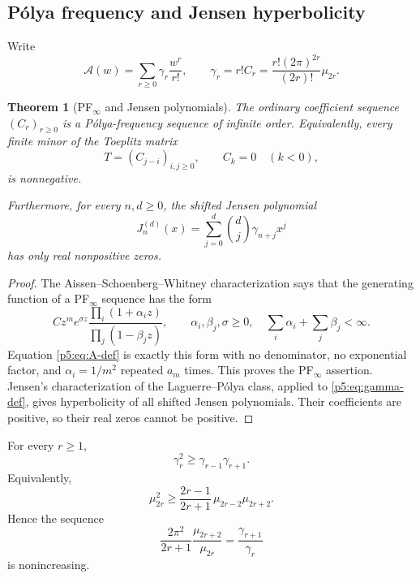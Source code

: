 \documentclass[11pt]{article}
\numberwithin{equation}{section}
\newtheorem{theorem}{Theorem}[section]
\theoremstyle{definition}
\theoremstyle{remark}
\begin{document}
\subsection{P\'olya frequency and Jensen hyperbolicity}

Write
\begin{equation}\label{p5:eq:gamma-def}
 \mathcal A(w)=\sum_{r\ge0}\gamma_r\frac{w^r}{r!},
 \qquad
 \gamma_r=r!C_r
 =\frac{r!(2\pi)^{2r}}{(2r)!}\mu_{2r}.
\end{equation}

\begin{theorem}[PF$_\infty$ and Jensen polynomials]\label{p5:thm:PF-Jensen}
The ordinary coefficient sequence $(C_r)_{r\ge0}$ is a P\'olya-frequency
sequence of infinite order.  Equivalently, every finite minor of the Toeplitz
matrix
\begin{equation}\label{p5:eq:Toeplitz}
 T=(C_{j-i})_{i,j\ge0},\qquad C_k=0\quad(k<0),
\end{equation}
is nonnegative.

Furthermore, for every $n,d\ge0$, the shifted Jensen polynomial
\begin{equation}\label{p5:eq:Jensen}
 J_n^{(d)}(x)=\sum_{j=0}^{d}\binom dj\gamma_{n+j}x^j
\end{equation}
has only real nonpositive zeros.
\end{theorem}

\begin{proof}
The Aissen--Schoenberg--Whitney characterization says that the generating
function of a PF$_\infty$ sequence has the form
\[
 Cz^me^{\sigma z}\frac{\prod_i(1+\alpha_i z)}
 {\prod_j(1-\beta_jz)},
 \qquad \alpha_i,\beta_j,\sigma\ge0,
 \quad \sum_i\alpha_i+\sum_j\beta_j<\infty.
\]
Equation \cref{p5:eq:A-def} is exactly this form with no denominator, no
exponential factor, and $\alpha_i=1/m^2$ repeated $a_m$ times.  This proves the
PF$_\infty$ assertion.  Jensen's characterization of the Laguerre--P\'olya
class, applied to \cref{p5:eq:gamma-def}, gives hyperbolicity of all shifted
Jensen polynomials.  Their coefficients are positive, so their real zeros
cannot be positive.
\end{proof}

\begin{corollary}\label{p5:cor:moment-turan}
For every $r\ge1$,
\begin{equation}\label{p5:eq:gamma-turan}
 \gamma_r^2\ge\gamma_{r-1}\gamma_{r+1}.
\end{equation}
Equivalently,
\begin{equation}\label{p5:eq:mu-turan}
 \boxed{
 \mu_{2r}^2\ge
 \frac{2r-1}{2r+1}\,\mu_{2r-2}\mu_{2r+2}.}
\end{equation}
Hence the sequence
\begin{equation}\label{p5:eq:ratio-monotone}
 \frac{2\pi^2}{2r+1}\frac{\mu_{2r+2}}{\mu_{2r}}
 =\frac{\gamma_{r+1}}{\gamma_r}
\end{equation}
is nonincreasing.
\end{corollary}
\end{document}
